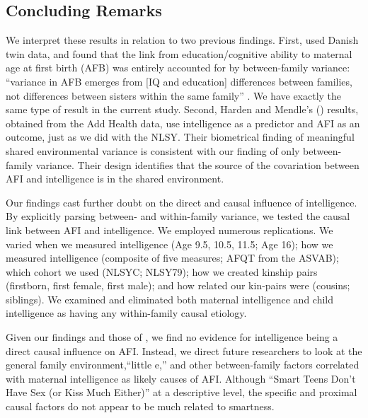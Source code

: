 \subsection{Concluding Remarks} We interpret these results in relation to two previous findings. First, \citet{Rodgers2008AJS} used Danish twin data, and found that the link from education/cognitive ability to maternal age at first birth (AFB) was entirely accounted for by between-family variance: ``variance in AFB emerges from [IQ and education] differences between families, not differences between sisters within the same family'' \citep[][p. 202]{Rodgers2008AJS}. We have exactly the same type of result in the current study. Second, Harden and Mendle's (\citeyear{harden2011don}) results, obtained from the Add Health data, use intelligence as a predictor and AFI as an outcome, just as we did with the NLSY. Their biometrical finding of meaningful shared environmental variance is consistent with our finding of only between-family variance. Their design identifies that the source of the covariation between AFI and intelligence is in the shared environment.

Our findings cast further doubt on the direct and causal influence of intelligence. By explicitly parsing between- and within-family variance, we tested the causal link between AFI and intelligence. We employed numerous replications. We varied when we measured intelligence (Age 9.5, 10.5, 11.5; Age 16); how we measured intelligence (composite of five measures; AFQT from the ASVAB); which cohort we used (NLSYC; NLSY79); how we created kinship pairs (firstborn, first female, first male); and how related our kin-pairs were (cousins; siblings). We examined and eliminated both maternal intelligence and child intelligence as having any within-family causal etiology.

Given our findings and those of \citet{harden2011don}, we find no evidence for intelligence being a direct causal influence on AFI. Instead, we direct future researchers to look at the general family environment,``little e,'' and other between-family factors correlated with maternal intelligence as likely causes of AFI.  Although ``Smart Teens Don't Have Sex (or Kiss Much Either)'' \citep{halpern2000smart} at a descriptive level, the specific and proximal causal factors do not appear to be much related to smartness.
